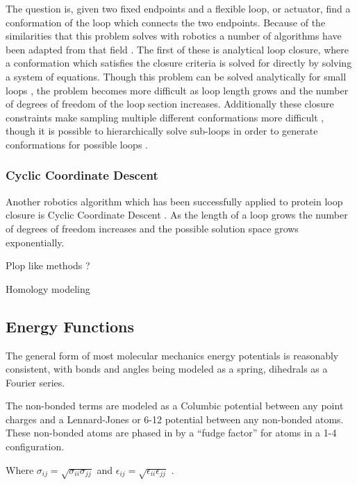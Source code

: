 The question is, given two fixed endpoints and a flexible loop, or actuator, find a conformation of the loop which connects the two endpoints.
Because of the similarities that this problem solves with robotics a number of algorithms have been adapted from that field \cite{kolodny2005inverse}.
The first of these is analytical loop closure, where a conformation which satisfies the closure criteria is solved for directly by solving a system of equations.
Though this problem can be solved analytically for small loops \cite{wedemeyer1999exact,go1970ring,bruccoleri1985chain,palmer1991standard}, the problem becomes more difficult as loop length grows and the number of degrees of freedom of the loop section increases.
Additionally these closure constraints make sampling multiple different conformations more difficult \cite{cortes2005sampling}, though it is possible to hierarchically solve sub-loops in order to generate conformations for possible loops \cite{wedemeyer1999exact}.

\subsubsection{Cyclic Coordinate Descent}
\label{subsubsection:cyclic_coordinate_descent}
Another robotics algorithm which has been successfully applied to protein loop closure is Cyclic Coordinate Descent \cite{canutescu2003cyclic}.
As the length of a loop grows the number of degrees of freedom increases and the possible solution space grows exponentially. 


\cite{moult1986algorithm}



Plop like methods ? \cite{kolodny2005inverse}


Homology modeling \cite{browne1969possible}

\subsection{Energy Functions}
\label{subsection:energy_functions}
The general form of most molecular mechanics energy potentials is reasonably consistent, with bonds and angles being modeled as a spring, dihedrals as a Fourier series.




The non-bonded terms are modeled as a Columbic potential between any point charges and a Lennard-Jones or 6-12 potential between any non-bonded atoms.
These non-bonded atoms are phased in by a ``fudge factor'' for atoms in a 1-4 configuration.

Where $\sigma_{ij} = \sqrt{\sigma_{ii} \sigma_{jj}}$ and $\epsilon_{ij} = \sqrt{\epsilon_{ii}\epsilon_{jj}}$ \cite{jorgensen1996development}.


\cite{moult1986algorithm}




